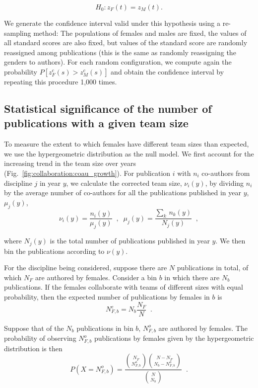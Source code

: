 \begin{equation}
H_0: z_F(t) = z_M(t).
\end{equation}

We generate the confidence interval valid under this hypothesis using a re-sampling method: The populations of females and males are fixed, the values of all standard scores are also fixed, but values of the standard score are randomly reassigned among publications (this is the same as randomly reassigning the genders to authors). For each random configuration, we compute again the probability $P\left[z_F^c(s) > z_M^c(s) \right]$ and obtain the confidence interval by repeating this procedure 1,000 times.


\subsection{Statistical significance of the number of publications with a given team size}

To measure the extent to which females have different team sizes than expected, we use the hypergeometric distribution as the null model. We first account for the increasing trend in the team size over years (Fig.~\ref{fig:collaboration:coau_growth}). For publication $i$ with $n_i$ co-authors from discipline $j$ in year $y$, we calculate the corrected team size, $\nu_i(y)$, by dividing $n_i$ by the average number of co-authors for all the publications published in year $y$, $\mu_j(y)$,
\begin{equation}
\nu_i(y)=\frac{n_i(y)}{\mu_j(y)}\;\;,\;\;\mu_j(y)=\frac{\sum\limits_k \, n_k(y)}{N_j(y)}\;\;,
\end{equation}

\noindent
where $N_j(y)$ is the total number of publications published in year $y$. We then bin the publications according to $\nu(y)$.

For the discipline being considered, suppose there are $N$ publications in total, of which $N_F$ are authored by females. Consider a bin $b$ in which there are $N_b$ publications. If the females collaborate with teams of different sizes with equal probability, then the expected number of publications by females in $b$ is
\begin{equation}
N_{F,b}^e=N_b\frac{N_F}{N}\;\;.
\end{equation}

Suppose that of the $N_b$ publications in bin $b$, $N_{F,b}^o$ are authored by females. The probability of observing $N_{F,b}^o$ publications by females given by the hypergeometric distribution is then
\begin{equation}
P(X=N_{F,b}^o)=\frac{\binom{N_F}{N_{F,b}^o}\binom{N-N_F}{N_b-N_{F,b}^o}}{\binom{N}{N_b}} \;\;.
\end{equation}

